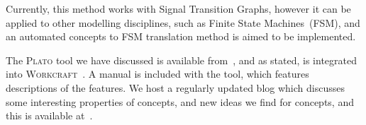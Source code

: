 \documentclass[british,conference,compsoc]{IEEEtran}
\newcommand{\noun}[1]{\textsc{#1}}
\begin{document}
Currently, this method works with Signal Transition Graphs, however
it can be applied to other modelling disciplines, such as Finite State
Machines~(FSM), and an automated concepts to FSM translation method
is aimed to be implemented.


The \noun{Plato} tool we have discussed is available 
from~\cite{2016_concepts_github}, and as stated, is integrated into 
\noun{Workcraft}~\cite{Workcraft_website}. A manual is included with the tool, 
which features descriptions of the features. We host a regularly updated blog 
which discusses some interesting properties of concepts, and new ideas we find 
for concepts, and this is available  at~\cite{2016_blog_concepts}.




\end{document}
